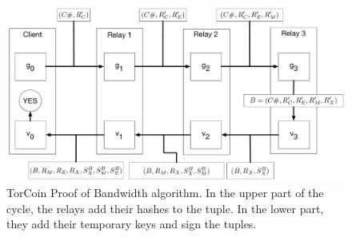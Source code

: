 \begin{figure}[H]
\centering
\includegraphics[scale=0.3]{torcoin_cycle.pdf}
\caption
{
TorCoin Proof of Bandwidth algorithm. In the upper part of the cycle, the relays
add their hashes to the tuple. In the lower part, they add their temporary keys
and sign the tuples.
}
\end{figure}